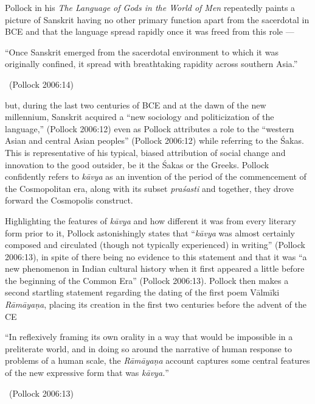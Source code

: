 Pollock in his \textit{The Language of Gods in the World of Men} repeatedly paints a picture of Sanskrit having no other primary function apart from the sacerdotal in BCE and that the language spread rapidly once it was freed from this role —

\begin{myquote}
“Once Sanskrit emerged from the sacerdotal environment to which it was originally confined, it spread with breathtaking rapidity across southern Asia.” 

~\hfill (Pollock 2006:14)
\end{myquote}

but, during the last two centuries of BCE and at the dawn of the new millennium, Sanskrit acquired a “new sociology and politicization of the language,” (Pollock 2006:12) even as Pollock attributes a role to the “western Asian and central Asian peoples” (Pollock 2006:12) while referring to the Śakas. This is representative of his typical, biased attribution of social change and innovation to the good outsider, be it the Śakas or the Greeks. Pollock confidently refers to \textit{kāvya} as an invention of the period of the commencement of the Cosmopolitan era, along with its subset \textit{praśasti} and together, they drove forward the Cosmopolis construct.

Highlighting the features of \textit{kāvya} and how different it was from every literary form prior to it, Pollock astonishingly states that “\textit{kāvya} was almost certainly composed and circulated (though not typically experienced) in writing” (Pollock 2006:13), in spite of there being no evidence to this statement and that it was “a new phenomenon in Indian cultural history when it first appeared a little before the beginning of the Common Era” (Pollock 2006:13). Pollock then makes a second startling statement regarding the dating of the first poem Vālmīki \textit{Rāmāyaṇa}, placing its creation in the first two centuries before the advent of the CE

\begin{myquote}
“In reflexively framing its own orality in a way that would be impossible in a preliterate world, and in doing so around the narrative of human response to problems of a human scale, the \textit{Rāmāyaṇa} account captures some central features of the new expressive form that was \textit{kāvya.}” 

~\hfill (Pollock 2006:13)
\end{myquote}

